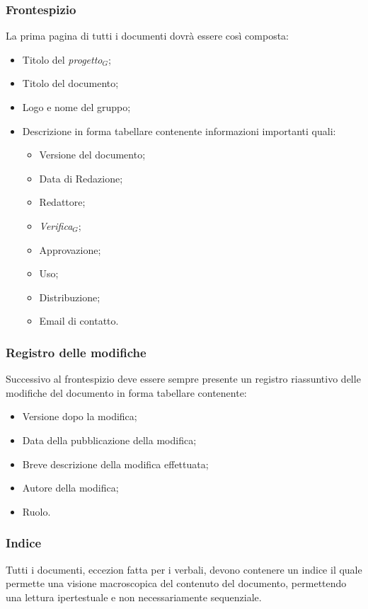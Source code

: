 \subsubsection{Frontespizio}
La prima pagina di tutti i documenti dovrà essere così composta:
\begin{itemize}
	\item Titolo del \textit{progetto$_{G}$};
	\item Titolo del documento;
	\item Logo e nome del gruppo;
	\item Descrizione in forma tabellare contenente informazioni importanti quali:
	\begin{itemize}
		\item Versione del documento;
		\item Data di Redazione;
		\item Redattore;
		\item \textit{Verifica$_{G}$};
		\item Approvazione;
		\item Uso;
		\item Distribuzione;
		\item Email di contatto.
	\end{itemize}
\end{itemize}

\subsubsection{Registro delle modifiche}
Successivo al frontespizio deve essere sempre presente un registro riassuntivo delle modifiche del documento in forma tabellare contenente:
\begin{itemize}
\item Versione dopo la modifica;
\item Data della pubblicazione della modifica;
\item Breve descrizione della modifica effettuata;
\item Autore della modifica;
\item Ruolo.
\end{itemize}
\subsubsection{Indice}
Tutti i documenti, eccezion fatta per i verbali, devono contenere un indice il quale permette una visione macroscopica del contenuto del documento,
permettendo una lettura ipertestuale e non necessariamente sequenziale.
